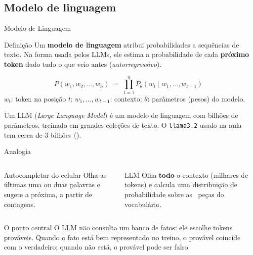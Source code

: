 \documentclass[aspectratio=169]{beamer}
\begin{document}
\subsection{Modelo de linguagem}
\begin{frame}{Modelo de Linguagem}
    \begin{block}{Definição}
        \footnotesize Um \textbf{modelo de linguagem} atribui probabilidades a sequências de texto. Na forma usada pelos LLMs, ele estima a probabilidade de cada \textbf{próximo token} dado tudo o que veio antes (\textit{autorregressivo}).
    \end{block}
    \pause
    \[
      P(w_1, w_2, \dots, w_n) \;=\; \prod_{t=1}^{n} P_\theta\!\left(w_t \mid w_1, \dots, w_{t-1}\right)
    \]
    \footnotesize $w_t$: token na posição $t$; $w_1,\dots,w_{t-1}$: contexto; $\theta$: parâmetros (pesos) do modelo.
    \pause
    \begin{alertblock}{}
        \footnotesize Um LLM (\textit{Large Language Model}) é um modelo de linguagem com bilhões de parâmetros, treinado em grandes coleções de texto. O \texttt{llama3.2} usado na aula tem cerca de 3 bilhões (\texttt{\vSIZE}).
    \end{alertblock}
\end{frame}

\begin{frame}{Analogia}
    \begin{columns}
        \begin{block}{Autocompletar do celular}
            \footnotesize Olha as últimas uma ou duas palavras e sugere a próxima, a partir de contagens.
        \end{block}
        \pause
        \begin{block}{LLM}
            \footnotesize Olha \textbf{todo} o contexto (milhares de tokens) e calcula uma distribuição de probabilidade sobre as \vVOC\ peças do vocabulário.
        \end{block}
    \end{columns}
    \pause
    \vspace{0.3cm}
    \begin{alertblock}{O ponto central}
        \footnotesize O LLM não consulta um banco de fatos: ele escolhe tokens prováveis. Quando o fato está bem representado no treino, o provável coincide com o verdadeiro; quando não está, o provável pode ser falso.
    \end{alertblock}
\end{frame}
\end{document}
